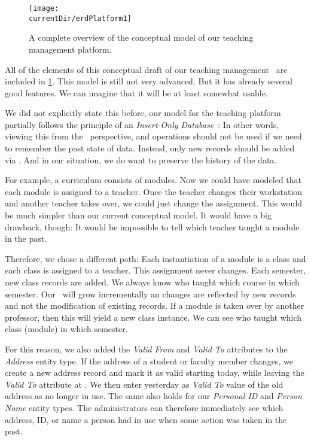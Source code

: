 \begin{figure}%
\centering%
\texttt{[image: \\currentDir/erdPlatform1]}%
\caption{A complete overview of the conceptual model of our teaching management platform.}%
\label{fig:erdPlatform1}%
\end{figure}%
%
All of the elements of this conceptual draft of our teaching management \db\ are included in \cref{fig:erdPlatform1}.
This model is still not very advanced.
But it has already several good features.
We can imagine that it will be at least somewhat usable.

We did not explicitly state this before, our model for the teaching platform partially follows the principle of an \emph{Insert-Only Database}~\cite{P2014ACIIMDMTIMOIMD:IO}:%
%
%
%
In other words, viewing this from the \sql\ perspective,  and  operations should not be used if we need to remember the past state of data.
Instead, only new records should be added via .
And in our situation, we do want to preserve the history of the data.

For example, a curriculum consists of modules.
Now we could have modeled that each module is assigned to a teacher.
Once the teacher changes their workstation and another teacher takes over, we could just change the assignment.
This would be much simpler than our current conceptual model.
It would have a big drawback, though:
It would be impossible to tell which teacher taught a module in the past.

Therefore, we chose a different path:
Each instantiation of a module is a class and each class is assigned to a teacher.
This assignment never changes.
Each semester, new class records are added.
We always know who taught which course in which semester.
Our \db\ will grow incrementally an changes are reflected by new records and not the modification of existing records.
If a module is taken over by another professor, then this will yield a new class instance.
We can see who taught which class (module) in which semester.

For this reason, we also added the \emph{Valid From} and \emph{Valid To} attributes to the \emph{Address} entity type.
If the address of a student or faculty member changes, we create a new address record and mark it as valid starting today, while leaving the \emph{Valid To} attribute at .
We then enter yesterday as \emph{Valid To} value of the old address as no longer in use.
The same also holds for our \emph{Personal ID} and \emph{Person Name} entity types.
The administrators can therefore immediately see which address, ID, or name a person had in use when some action was taken in the past.

